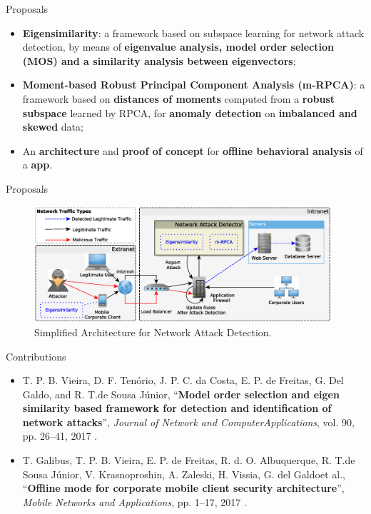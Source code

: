 \documentclass[newPxFont, numfooter, sectionpages]{beamer}
\begin{document}
\begin{frame}[c]{Proposals}
    \begin{itemize}
    	\item \textbf{Eigensimilarity}: a framework based on subspace learning for network attack detection, by means of \textbf{eigenvalue analysis, model order selection (MOS) and a similarity analysis between eigenvectors};
    	\item \textbf{Moment-based Robust Principal Component Analysis (m-RPCA)}: a framework based on\textbf{ distances of moments} computed from a \textbf{robust subspace} learned by RPCA, for \textbf{anomaly detection} on \textbf{imbalanced and skewed} data;
    	\item An \textbf{architecture} and \textbf{proof of concept} for \textbf{offline behavioral analysis} of a \textbf{app}.
    \end{itemize}
\end{frame}

\begin{frame}[c]{Proposals}
    \begin{figure}[h!]
    	     \centering
    	     \includegraphics[width=11cm]{figures/ch1/architecture.eps}
    	     \caption{Simplified Architecture for Network Attack Detection.}
    	     \label{fig:2_fig1}
    	\end{figure}
\end{frame}

\begin{frame}[c]{Contributions}
    \begin{itemize}
    	\item T. P. B. Vieira, D. F. Tenório, J. P. C. da Costa, E. P. de Freitas, G. Del Galdo, and R. T.de Sousa Júnior, “\textbf{Model order selection and eigen similarity based framework for detection and identification of network attacks}\textbf{}”, \textit{Journal of Network and ComputerApplications}, vol. 90, pp. 26–41, 2017 \cite{vieira2017model}.
    	\item T. Galibus, T. P. B. Vieira, E. P. de Freitas, R. d. O. Albuquerque, R. T.de Sousa Júnior, V. Krasnoproshin, A. Zaleski, H. Vissia, G. del Galdoet al., “\textbf{Offline mode for corporate mobile client security architecture}”, \textit{Mobile Networks and Applications}, pp. 1–17, 2017 \cite{galibus2017offline}.
    \end{itemize}
\end{frame}
\end{document}
